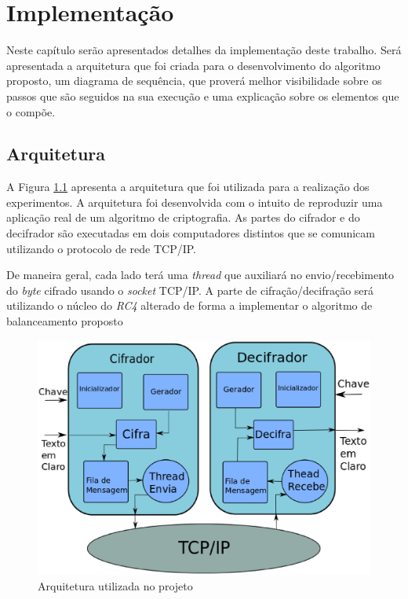 \chapter{Implementação}
\label{implementation-algorithm}

Neste capítulo serão apresentados detalhes da implementação deste trabalho. Será apresentada a arquitetura que foi criada para o desenvolvimento do algoritmo proposto, um diagrama de sequência, que proverá melhor visibilidade sobre os passos que são seguidos na sua execução e uma explicação sobre os elementos que o compõe.

\section{Arquitetura}

A Figura \ref{architecture} apresenta a arquitetura que foi utilizada para a realização dos experimentos. A arquitetura foi desenvolvida com o intuito de reproduzir uma aplicação real de um algoritmo de criptografia. As partes do cifrador e do decifrador são executadas em dois computadores distintos que se comunicam utilizando o protocolo de rede TCP/IP.

De maneira geral, cada lado terá uma \textit{thread} que auxiliará no envio/recebimento do \textit{byte} cifrado usando o \textit{socket} TCP/IP. A parte de cifração/decifração será utilizando o núcleo do \textit{RC4} alterado de forma a implementar o algoritmo de balanceamento proposto

\begin{figure}[h]
	\centering
	\includegraphics[scale=0.5]{figuras/architecture.eps}
	\caption{Arquitetura utilizada no projeto}
	\label{architecture}
\end{figure}

